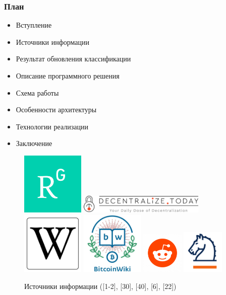 \documentclass{beamer}
\begin{document}
\begin{frame}
    \frametitle{План}
    \begin{itemize}
        \item Вступление
        \item Источники информации
        \item Результат обновления классификации
        \item Описание программного решения
        \item Схема работы
        \item Особенности архитектуры
        \item Технологии реализации
        \item Заключение
    \end{itemize}
\end{frame}

\begin{frame}
    \begin{figure}
    \includegraphics[width=3cm]{rg_logo}\pause
    \vfill
    \includegraphics[width=6cm]{decentr_logo}\pause
    \includegraphics[width=3cm]{wiki_logo}\pause
    \includegraphics[width=3cm]{btcwiki_logo}\pause
    \hfill
    \includegraphics[width=2cm]{reddit_logo}\pause
    \includegraphics[width=2cm]{springer_logo}
        \caption{Источники информации ([1-2], [30], [40], [6], [22])}
    \end{figure}
\end{frame}
\end{document}
